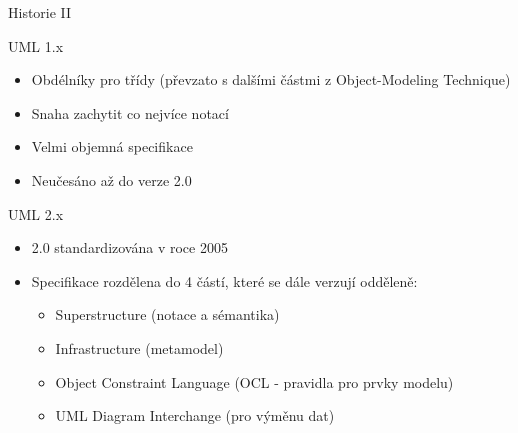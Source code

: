 \begin{frame}{Historie II}

\onslide<+->UML 1.x
\begin{itemize}[<+->]
    \item<+->Obdélníky pro třídy (převzato s dalšími částmi z Object-Modeling 
             Technique)
    \item<+->Snaha zachytit co nejvíce notací
    \item<+->Velmi objemná specifikace
    \item<+->Neučesáno až do verze 2.0
\end{itemize}  

\onslide<+->UML 2.x
\begin{itemize}[<+->]
    \item<+->2.0 standardizována v roce 2005
    \item<+->Specifikace rozdělena do 4 částí, které se dále verzují odděleně:
    \begin{itemize}
        \item<+->Superstructure (notace a sémantika)
        \item<+->Infrastructure (metamodel)
        \item<+->Object Constraint Language (OCL - pravidla pro prvky modelu)
        \item<+->UML Diagram Interchange (pro výměnu dat)
    \end{itemize} 
    
\end{itemize}  


\end{frame}